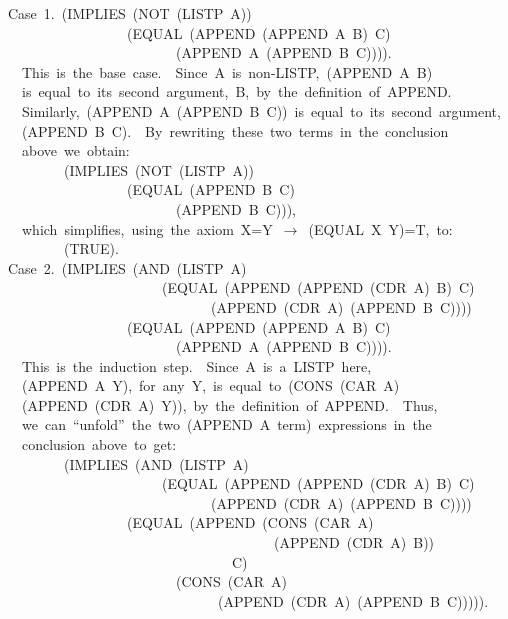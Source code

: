 \documentclass[11pt]{book}
\newenvironment{pubasis}{\begin{flushleft}\ttfamily\small}{\normalsize\rmfamily\end{flushleft}}
\begin{document}
\begin{pubasis}
Case~1.~(IMPLIES~(NOT~(LISTP~A))\\
~~~~~~~~~~~~~~~~~(EQUAL~(APPEND~(APPEND~A~B)~C)\\
~~~~~~~~~~~~~~~~~~~~~~~~(APPEND~A~(APPEND~B~C)))).\\

~~This~is~the~base~case.~~Since~A~is~non-LISTP,~(APPEND~A~B)\\
~~is~equal~to~its~second~argument,~B,~by~the~definition~of~APPEND.\\
~~Similarly,~(APPEND~A~(APPEND~B~C))~is~equal~to~its~second~argument,\\
~~(APPEND~B~C).~~By~rewriting~these~two~terms~in~the~conclusion\\
~~above~we~obtain:\\

~~~~~~~~(IMPLIES~(NOT~(LISTP~A))\\
~~~~~~~~~~~~~~~~~(EQUAL~(APPEND~B~C)\\
~~~~~~~~~~~~~~~~~~~~~~~~(APPEND~B~C))),\\

~~which~simplifies,~using~the~axiom~X=Y~$\rightarrow$~(EQUAL~X~Y)=T,~to:\\

~~~~~~~~(TRUE).\\

Case~2.~(IMPLIES~(AND~(LISTP~A)\\
~~~~~~~~~~~~~~~~~~~~~~(EQUAL~(APPEND~(APPEND~(CDR~A)~B)~C)\\
~~~~~~~~~~~~~~~~~~~~~~~~~~~~~(APPEND~(CDR~A)~(APPEND~B~C))))\\
~~~~~~~~~~~~~~~~~(EQUAL~(APPEND~(APPEND~A~B)~C)\\
~~~~~~~~~~~~~~~~~~~~~~~~(APPEND~A~(APPEND~B~C)))).\\

~~This~is~the~induction~step.~~Since~A~is~a~LISTP~here,\\
~~(APPEND~A~Y),~for~any~Y,~is~equal~to~(CONS~(CAR~A)\\
~~(APPEND~(CDR~A)~Y)),~by~the~definition~of~APPEND.~~Thus,\\
~~we~can~``unfold''~the~two~(APPEND~A~term)~expressions~in~the\\
~~conclusion~above~to~get:\\

~~~~~~~~(IMPLIES~(AND~(LISTP~A)\\
~~~~~~~~~~~~~~~~~~~~~~(EQUAL~(APPEND~(APPEND~(CDR~A)~B)~C)\\
~~~~~~~~~~~~~~~~~~~~~~~~~~~~~(APPEND~(CDR~A)~(APPEND~B~C))))\\
~~~~~~~~~~~~~~~~~(EQUAL~(APPEND~(CONS~(CAR~A)\\
~~~~~~~~~~~~~~~~~~~~~~~~~~~~~~~~~~~~~~(APPEND~(CDR~A)~B))\\
~~~~~~~~~~~~~~~~~~~~~~~~~~~~~~~~C)\\
~~~~~~~~~~~~~~~~~~~~~~~~(CONS~(CAR~A)\\
~~~~~~~~~~~~~~~~~~~~~~~~~~~~~~(APPEND~(CDR~A)~(APPEND~B~C))))).\\


\end{pubasis}
\end{document}
